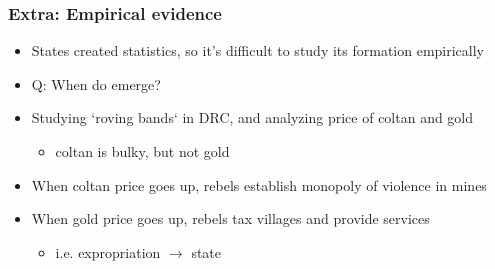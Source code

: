 \documentclass[aspectratio=43]{beamer}
\begin{document}
\begin{frame}
\frametitle{Extra: Empirical evidence}
\centering

\begin{minipage}{0.65\textwidth}\centering
  \begin{itemize}
    \item States created statistics, so it's difficult to study its formation empirically
    \item Q: When do  emerge?
    \item<2-> Studying `roving bands` in DRC, and analyzing price of coltan and gold
    \begin{itemize}
      \item coltan is bulky, but not gold
    \end{itemize}
    \item<3-> When coltan price goes up, rebels establish monopoly of violence in mines
    \item<3-> When gold price goes up, rebels tax villages and provide services
    \begin{itemize}
      \item i.e. expropriation $\rightarrow$ state
    \end{itemize}
  \end{itemize}
\end{minipage}\hfill
\begin{minipage}{0.34\textwidth}\centering

\end{minipage}
\end{frame}
\end{document}
